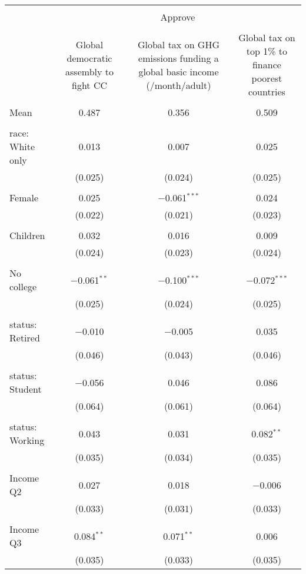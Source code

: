 
\begin{tabular}{@{\extracolsep{5pt}}lccc} 
\\[-1.8ex]\hline 
\hline \\[-1.8ex] 
 & \multicolumn{3}{c}{Approve} \\ 
\cline{2-4} 
\\[-1.8ex] & Global democratic assembly to fight CC & Global tax on GHG emissions funding a global basic income (\textdollar 30/month/adult) & Global tax on top 1\% to finance poorest countries \\ 
\hline \\[-1.8ex] 
 Mean & 0.487 & 0.356 & 0.509  \\ \hline \\[-1.8ex] race: White only & 0.013 & 0.007 & 0.025 \\ 
  & (0.025) & (0.024) & (0.025) \\ 
  & & & \\ 
 Female & 0.025 & $-$0.061$^{***}$ & 0.024 \\ 
  & (0.022) & (0.021) & (0.023) \\ 
  & & & \\ 
 Children & 0.032 & 0.016 & 0.009 \\ 
  & (0.024) & (0.023) & (0.024) \\ 
  & & & \\ 
 No college & $-$0.061$^{**}$ & $-$0.100$^{***}$ & $-$0.072$^{***}$ \\ 
  & (0.025) & (0.024) & (0.025) \\ 
  & & & \\ 
 status: Retired & $-$0.010 & $-$0.005 & 0.035 \\ 
  & (0.046) & (0.043) & (0.046) \\ 
  & & & \\ 
 status: Student & $-$0.056 & 0.046 & 0.086 \\ 
  & (0.064) & (0.061) & (0.064) \\ 
  & & & \\ 
 status: Working & 0.043 & 0.031 & 0.082$^{**}$ \\ 
  & (0.035) & (0.034) & (0.035) \\ 
  & & & \\ 
 Income Q2 & 0.027 & 0.018 & $-$0.006 \\ 
  & (0.033) & (0.031) & (0.033) \\ 
  & & & \\ 
 Income Q3 & 0.084$^{**}$ & 0.071$^{**}$ & 0.006 \\ 
  & (0.035) & (0.033) & (0.035) \\ 

\end{tabular}
